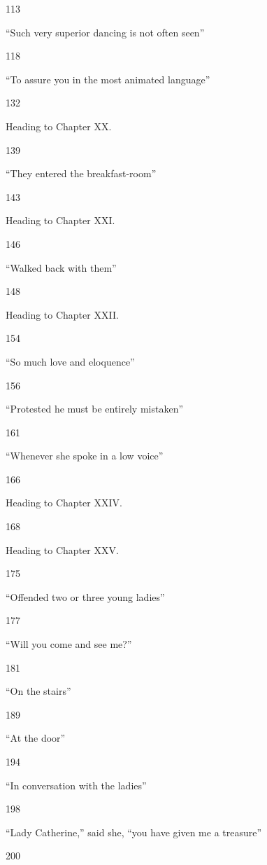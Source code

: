\documentclass[10pt]{book}
\begin{document}
       113
      

      “Such very superior dancing is not often seen”
     

       118
      

      “To assure you in the most animated language”
     

       132
      

      Heading to Chapter XX.
     

       139
      

      “They entered the breakfast-room”
     

       143
      

      Heading to Chapter XXI.
     

       146
      

      “Walked back with them”
     

       148
      

      Heading to Chapter XXII.
     

       154
      

      “So much love and eloquence”
     

       156
      

      “Protested he must be entirely mistaken”
     

       161
      

      “Whenever she spoke in a low voice”
     

       166
      

      Heading to Chapter XXIV.
     

       168
      

      Heading to Chapter XXV.
     

       175
      

      “Offended two or three young ladies”
     

       177
      

      “Will you come and see me?”
     

       181
      

      “On the stairs”
     

       189
      

      “At the door”
     

       194
      

      “In conversation with the ladies”
     

       198
      

      “Lady Catherine,” said she, “you have given me a treasure”
     

       200
      
\end{document}
